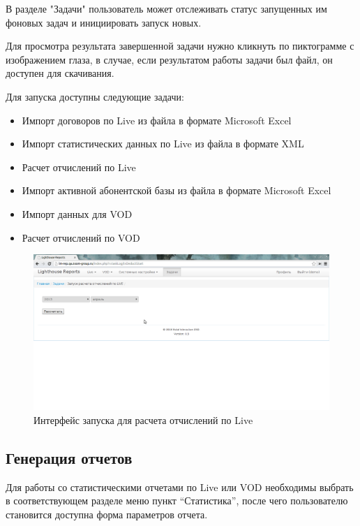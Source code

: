 В разделе "Задачи" пользователь может отслеживать статус запущенных им фоновых задач
и инициировать запуск новых.

Для просмотра результата завершенной задачи нужно кликнуть по пиктограмме с изображением глаза,
в случае, если результатом работы задачи был файл, он доступен для скачивания.

Для запуска доступны следующие задачи:
\begin{itemize}
\item{
  Импорт договоров по Live из файла в формате Microsoft Excel
}
\item{
  Импорт статистических данных по Live из файла в формате XML
}
\item{
  Расчет отчислений по Live
}
\item{
  Импорт активной абонентской базы из файла в формате Microsoft Excel
}
\item{
  Импорт данных для VOD 
}
\item{
  Расчет отчислений по VOD
}
\end{itemize}

\begin{figure}[!ht]
\begin{center}
\hspace*{-1cm} \includegraphics[scale=0.35, trim=0mm 70mm 250mm 10mm, clip]{../resources/screens/deduct_start.png}
\caption{Интерфейс запуска для расчета отчислений по Live}
\end{center}
\end{figure}

\subsection*{Генерация отчетов}
Для работы со статистическими отчетами по Live или VOD необходимы выбрать
в соответствующем разделе меню пункт ``Статистика'', после чего пользователю
становится доступна форма параметров отчета.


